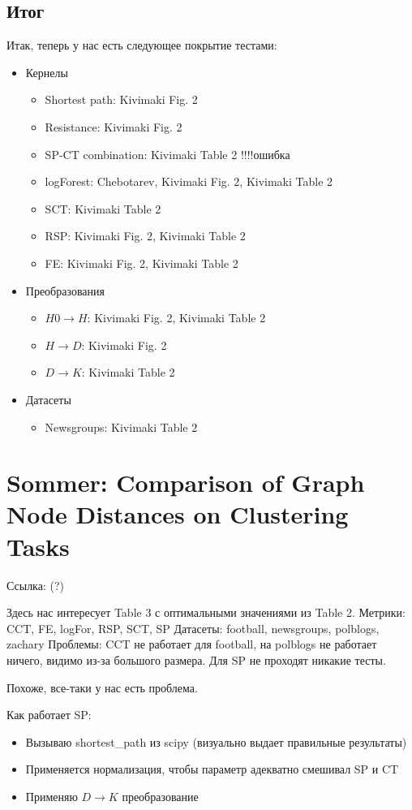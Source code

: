 \documentclass{article}
\begin{document}
\subsection{Итог}
Итак, теперь у нас есть следующее покрытие тестами:
\begin{itemize}
  \item Кернелы
  \begin{itemize}
    \item Shortest path: Kivimaki Fig. 2
    \item Resistance: Kivimaki Fig. 2
    \item SP-CT combination: Kivimaki Table 2 !!!!ошибка
    \item logForest: Chebotarev, Kivimaki Fig. 2, Kivimaki Table 2
    \item SCT: Kivimaki Table 2
    \item RSP: Kivimaki Fig. 2, Kivimaki Table 2
    \item FE: Kivimaki Fig. 2, Kivimaki Table 2
  \end{itemize}
  \item Преобразования
  \begin{itemize}
    \item $H0 \rightarrow H$: Kivimaki Fig. 2, Kivimaki Table 2 
    \item $H \rightarrow D$: Kivimaki Fig. 2
    \item $D \rightarrow K$: Kivimaki Table 2
   \end{itemize}
   \item Датасеты
   \begin{itemize}
     \item Newsgroups: Kivimaki Table 2
   \end{itemize}
\end{itemize}

\section{Sommer: Comparison of Graph Node Distances on Clustering Tasks}
Ссылка: (?)

Здесь нас интересует Table 3 с оптимальными значениями из Table 2.
Метрики: CCT, FE, logFor, RSP, SCT, SP
Датасеты: football, newsgroups, polblogs, zachary
Проблемы: CCT не работает для football, на polblogs не работает ничего, видимо из-за большого размера. Для SP не проходят никакие тесты.

Похоже, все-таки у нас есть проблема.

Как работает SP:
\begin{itemize}
  \item Вызываю shortest\_path из scipy (визуально выдает правильные результаты)
  \item Применяется нормализация, чтобы параметр адекватно смешивал SP и CT
  \item Применяю $D \rightarrow K$ преобразование
\end{itemize}
\end{document}
